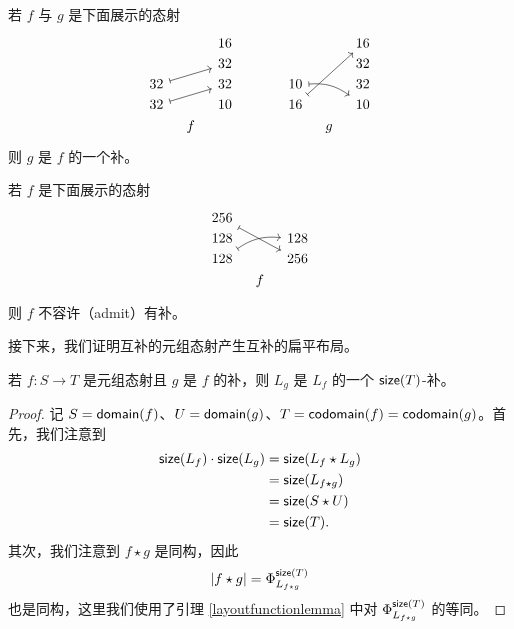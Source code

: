 \begin{example}
    若 $f$ 与 $g$ 是下面展示的态射
    \[ \begin{tikzcd} [row sep = 1, column sep = 8]
     & & 16 & & & & & & 16 \\
     & & 32 & & & &  & & 32\\ 
    32 \ar[rru,mapsto] & & 32 & & & & 10 \ar[rrd, bend left = 20, mapsto] & & 32\\
    32 \ar[rru,mapsto] & & 10 & & & & 16 \ar[rruuu, mapsto]  & & 10 \\
     & f & & & & & & g & 
    \end{tikzcd} \]
    则 $g$ 是 $f$ 的一个补。
\end{example}

\begin{example}
    若 $f$ 是下面展示的态射
    \[\begin{tikzcd}[row sep = 1, column sep = 8]
    256 \ar[rrdd,mapsto] & & \\
    128 & & 128\\ 
    128 \ar[rru,bend left = 20,mapsto] & & 256 \\
    & f & \\
    \end{tikzcd} \]
    则 $f$ 不容许（admit）有补。 
\end{example}

\noindent 接下来，我们证明互补的元组态射产生互补的扁平布局。

\begin{proposition}\label{complementofmorphisminCproposition}
    若 $f:S \to T$ 是元组态射且 $g$ 是 $f$ 的补，则 $L_{g}$ 是 $L_f$ 的一个 $\mathsf{size}(T)$-补。
\end{proposition}

\begin{proof}
    记 $S = \mathsf{domain}(f)$、$U = \mathsf{domain}(g)$、$T = \mathsf{codomain}(f) = \mathsf{codomain}(g)$。首先，我们注意到
    \begin{align*}
    \mathsf{size}(L_f) \cdot \mathsf{size}(L_{g}) & = \mathsf{size}(L_f\star L_{g})\\
    & = \mathsf{size}(L_{f \star g})\\
    & = \mathsf{size}(S \star U)\\
    & = \mathsf{size}(T).
    \end{align*}
    其次，我们注意到 $f \star g$ 是同构，因此
    \[
    |f \star g| = \Phi_{L_{f \star g}}^{\mathsf{size}(T)} 
    \]
    也是同构，这里我们使用了引理 \ref{layoutfunctionlemma} 中对 $\Phi^{\mathsf{size}(T)}_{L_{f \star g}}$ 的等同。
\end{proof}

